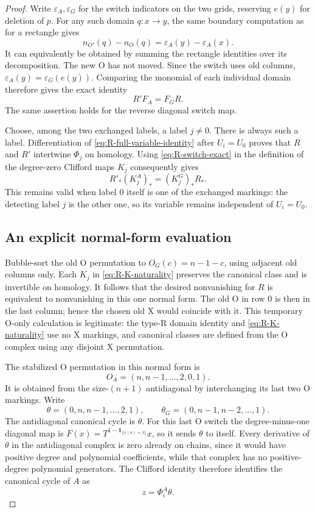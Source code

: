 \documentclass[11pt,a4paper]{article}
\theoremstyle{remark}
\begin{document}
\begin{proof}
Write $\varepsilon_A,\varepsilon_G$ for the switch indicators on the
two grids, reserving $e(y)$ for deletion of $p$.  For any such domain
$q:x\to y$, the same boundary computation as for a rectangle gives
\[
 n_{O'}(q)-n_O(q)=\varepsilon_A(y)-\varepsilon_A(x).
\]
It can equivalently be obtained by summing the rectangle identities
over its decomposition.  The new O has not moved.  Since the switch
uses old columns, $\varepsilon_A(y)=\varepsilon_G(e(y))$.  Comparing
the monomial of each individual domain therefore gives the exact identity
\begin{equation}\label{eq:R-switch-exact}
 R'F_A=F_G R.
\end{equation}
The same assertion holds for the reverse diagonal switch map.

Choose, among the two exchanged labels, a label $j\ne0$.  There is
always such a label.  Differentiation of
\eqref{eq:R-full-variable-identity} after $U_i=U_0$ proves that $R$
and $R'$ intertwine $\Phi_j$ on homology.  Using
\eqref{eq:R-switch-exact} in the definition of the degree-zero
Clifford maps $K_j$ consequently gives
\begin{equation}\label{eq:R-K-naturality}
 R'_* (K_j^A)_*=(K_j^G)_* R_*.
\end{equation}
This remains valid when label $0$ itself is one of the exchanged
markings: the detecting label $j$ is the other one, so its variable
remains independent of $U_i=U_0$.

\subsection{An explicit normal-form evaluation}

Bubble-sort the old O permutation to $O_G(c)=n-1-c$, using adjacent
old columns only.  Each $K_j$ in \eqref{eq:R-K-naturality} preserves
the canonical class and is invertible on homology.  It follows that
the desired nonvanishing for $R$ is equivalent to nonvanishing in
this one normal form.  The old O in row $0$ is then in the last
column; hence the chosen old X would coincide with it.  This temporary
O-only calculation is legitimate: the type-R domain identity and
\eqref{eq:R-K-naturality} use no X markings, and canonical classes
are defined from the O complex using any disjoint X permutation.

The stabilized O permutation in this normal form is
\[
 O_A=(n,n-1,\ldots,2,0,1).
\]
It is obtained from the size-$(n+1)$ antidiagonal by interchanging
its last two O markings.  Write
\[
 \theta=(0,n,n-1,\ldots,2,1),\qquad
 \theta_G=(0,n-1,n-2,\ldots,1).
\]
The antidiagonal canonical cycle is $\theta$.  For this last O switch
the degree-minus-one diagonal map is
$F(x)=T^{1-\mathbf1_{\{x(n)=1\}}}x$, so it sends $\theta$ to itself.
Every derivative of $\theta$ in the antidiagonal complex is zero
already on chains, since it would have positive degree and polynomial
coefficients, while that complex has no positive-degree polynomial
generators.  The Clifford identity therefore identifies the canonical
cycle of $A$ as
\[
 z=\Phi_i^A\theta.
\]


\end{proof}
\end{document}
